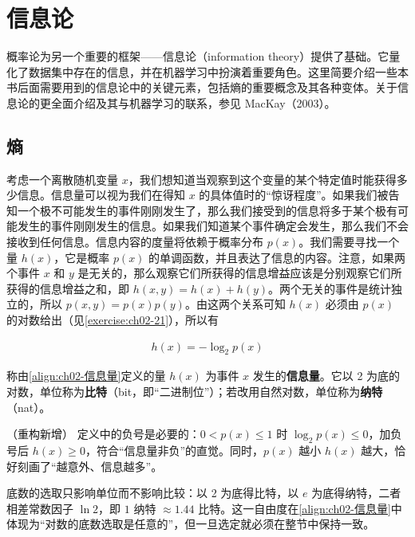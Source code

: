 \documentclass[../../main.tex]{subfiles}
\begin{document}
\section{信息论}\label{section:ch02-信息论}

概率论为另一个重要的框架——信息论（information theory）提供了基础。它量化了数据集中存在的信息，并在机器学习中扮演着重要角色。这里简要介绍一些本书后面需要用到的信息论中的关键元素，包括熵的重要概念及其各种变体。关于信息论的更全面介绍及其与机器学习的联系，参见 MacKay（2003）。

\subsection{熵}\label{subsection:ch02-熵}

考虑一个离散随机变量 $x$，我们想知道当观察到这个变量的某个特定值时能获得多少信息。信息量可以视为我们在得知 $x$ 的具体值时的“惊讶程度”。如果我们被告知一个极不可能发生的事件刚刚发生了，那么我们接受到的信息将多于某个极有可能发生的事件刚刚发生的信息。如果我们知道某个事件确定会发生，那么我们不会接收到任何信息。信息内容的度量将依赖于概率分布 $p(x)$。我们需要寻找一个量 $h(x)$，它是概率 $p(x)$ 的单调函数，并且表达了信息的内容。注意，如果两个事件 $x$ 和 $y$ 是无关的，那么观察它们所获得的信息增益应该是分别观察它们所获得的信息增益之和，即 $h(x,y)=h(x)+h(y)$。两个无关的事件是统计独立的，所以 $p(x,y)=p(x)p(y)$。由这两个关系可知 $h(x)$ 必须由 $p(x)$ 的对数给出（见\cref{exercise:ch02-21}），所以有

\begin{align}
  h(x) = -\log_2 p(x)
  \label{align:ch02-信息量}
\end{align}

\begin{definition}[信息量]\label{definition:ch02-信息量}
称由\eqref{align:ch02-信息量}定义的量 $h(x)$ 为事件 $x$ 发生的\textbf{信息量}。它以 2 为底的对数，单位称为\textbf{比特}（bit，即“二进制位”）；若改用自然对数，单位称为\textbf{纳特}（nat）。
\end{definition}

\begin{remark}（重构新增）
定义中的负号是必要的：$0<p(x)\leqslant1$ 时 $\log_2p(x)\leqslant0$，加负号后 $h(x)\geqslant0$，符合“信息量非负”的直觉。同时，$p(x)$ 越小 $h(x)$ 越大，恰好刻画了“越意外、信息越多”。

底数的选取只影响单位而不影响比较：以 2 为底得比特，以 $e$ 为底得纳特，二者相差常数因子 $\ln2$，即 $1$ 纳特 $\approx1.44$ 比特。这一自由度在\eqref{align:ch02-信息量}中体现为“对数的底数选取是任意的”，但一旦选定就必须在整节中保持一致。
\end{remark}
\end{document}
